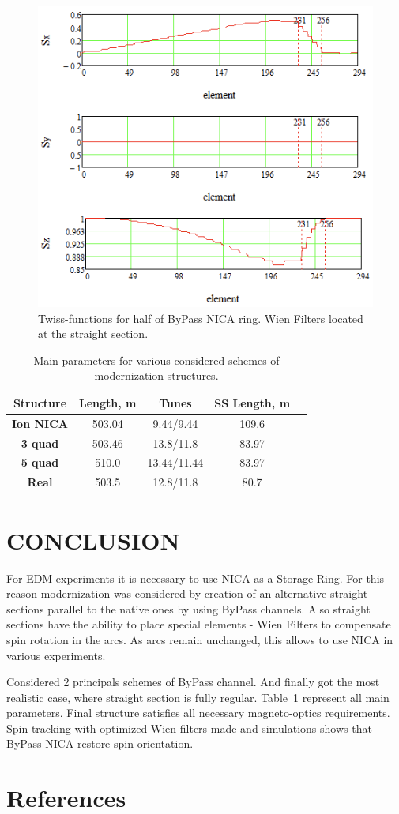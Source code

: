 \documentclass[a4paper]{jpconf}
\begin{document}
\begin{figure}[!h]
   \centering
   \includegraphics*[width=0.74\columnwidth]{fig8}
   \caption{Twiss-functions for half of ByPass NICA ring. Wien Filters located at the straight section.}
   \label{fig:spin}
\end{figure}

\begin{table}[!h]
    \centering
    \caption{Main parameters for various considered schemes of modernization structures.}
    \begin{tabular}{|c||c|c|c|c|}
    \hline
        \textbf{Structure} & \textbf{Length, m} & \textbf{Tunes} & \textbf{SS Length, m} \\ \hline
        \textbf{Ion NICA} & 503.04 & 9.44/9.44 & 109.6  \\ 
        \textbf{3 quad} & 503.46 & 13.8/11.8 & 83.97  \\ 
        \textbf{5 quad} & 510.0 & 13.44/11.44 & 83.97  \\ 
        \textbf{Real} & 503.5 & 12.8/11.8 & 80.7 \\ \hline
    \end{tabular}
    \label{lengths}
\end{table}

\section{CONCLUSION}

\par For EDM experiments it is necessary to use NICA as a Storage Ring. 
For this reason modernization was considered by creation of an alternative straight sections parallel to the native ones by using ByPass channels.
Also straight sections have the ability to place special elements - Wien Filters to compensate spin rotation in the arcs.
As arcs remain unchanged, this allows to use NICA in various experiments.
\par Considered 2 principals schemes of ByPass channel.
And finally got the most realistic case, where straight section is fully regular. 
Table~\ref{lengths} represent all main parameters.
Final structure satisfies all necessary magneto-optics requirements. Spin-tracking with optimized Wien-filters made and simulations shows that ByPass NICA restore spin orientation.

\section*{References}


\end{document}
